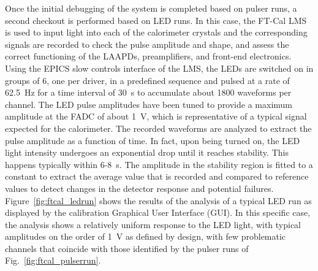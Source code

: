 Once the initial debugging of the system is completed based on pulser runs, a second checkout is performed based
on LED runs. In this case, the FT-Cal LMS is used to input light into each of the calorimeter crystals and the
corresponding signals are recorded to check the pulse amplitude and shape, and assess the correct functioning of
the LAAPDs, preamplifiers, and front-end electronics. Using the EPICS slow controls interface of the LMS, the LEDs
are switched on in groups of 6, one per driver, in a predefined sequence and pulsed at a rate of 62.5~Hz for a time
interval of 30~s to accumulate about 1800 waveforms per channel. The LED pulse amplitudes have been tuned to
provide a maximum amplitude at the FADC of about 1~V, which is representative of a typical signal expected for the
calorimeter. The recorded waveforms are analyzed to extract the pulse amplitude as a function of time. In fact, upon
being turned on, the LED light intensity undergoes an exponential drop until it reaches stability. This happens typically
within 6-8~s. The amplitude in the stability region is fitted to a constant to extract the average value that is recorded
and compared to reference values to detect changes in the detector response and potential failures.
Figure~\ref{fig:ftcal_ledrun} shows the results of the analysis of a typical LED run as displayed by the calibration
Graphical User Interface (GUI). In this specific case, the analysis shows a relatively uniform response to the LED light,
with typical amplitudes on the order of 1~V as defined by design, with few problematic channels that coincide with those
identified by the pulser runs of Fig.~\ref{fig:ftcal_pulserrun}. 

